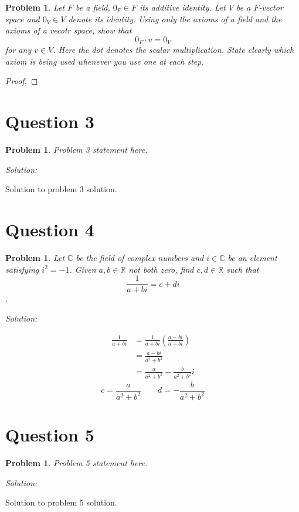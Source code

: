 \documentclass[12pt, letterpaper]{article}
\newenvironment{sol}
    {\emph{Solution:}
    }
    {
    }
\theoremstyle{plain}
\newtheorem{prob}[theorem]{Problem}
\theoremstyle{definition}
\theoremstyle{remark}
\begin{document}
\begin{prob}
Let $F$ be a field, $0_F\in F$ its additive identity. Let $V$ be a $F$-vector space and $0_V\in V$ denote its identity. Using only the axioms of a field and the axioms of a vecotr space, show that $$0_F\cdot v=0_V$$ for any $v\in V$. Here the dot denotes the scalar multiplication. State clearly which axiom is being used whenever you use one at each step.
\end{prob}

\begin{proof}

\end{proof}

\section{Question 3} %

\begin{prob}
Problem 3 statement here.
\end{prob}

\begin{sol}
Solution to problem 3 solution.
\end{sol}

\section{Question 4} %

\begin{prob}
	Let $\mathbb{C}$ be the field of complex numbers and $i\in\mathbb{C}$ be an element satisfying $i^2=-1$. Given $a,b\in\mathbb{R}$ not both zero, find $c,d\in\mathbb{R}$ such that $$\frac1{a+bi}=c+di$$.
\end{prob}

\begin{sol}
	\begin{align*}
		\frac1{a+bi} &= \frac1{a+bi}\left(\frac{a-bi}{a-bi}\right) \\
			     &= \frac{a-bi}{a^2+b^2} \\
			     &= \frac a{a^2+b^2}-\frac b{a^2+b^2}i
	\end{align*}
	$$c=\frac a{a^2+b^2}\qquad d=-\frac b{a^2+b^2}$$
\end{sol}

\section{Question 5} %

\begin{prob}
Problem 5 statement here.
\end{prob}

\begin{sol}
Solution to problem 5 solution.
\end{sol}
\end{document}
